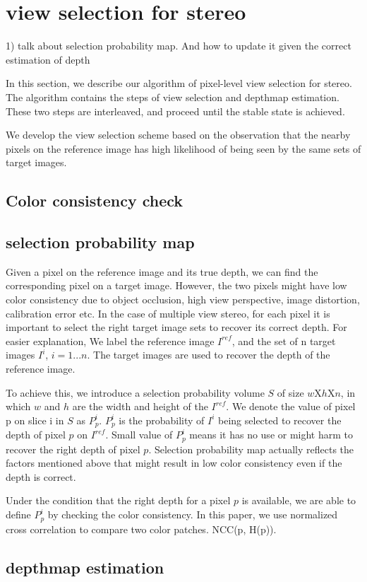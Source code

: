 \section{view selection for stereo}

1) talk about selection probability map. And how to update it given the correct estimation of depth


In this section, we describe our algorithm of pixel-level view selection for stereo.
The algorithm contains the steps of view selection and depthmap estimation.
These two steps are interleaved, and proceed until the stable state is achieved.

We develop the view selection scheme based on the observation that the nearby pixels on the reference image has high likelihood of being seen by the same sets of target images.

\subsection{Color consistency check}







\subsection{selection probability map}

Given a pixel on the reference image and its true depth, we can find the corresponding pixel on a target image. However, the two pixels might have low color consistency due to object occlusion, high view perspective, image distortion, calibration error etc. In the case of multiple view stereo, for each pixel it is important to select the right target image sets to recover its correct depth. For easier explanation, We label the reference image $I^{ref}$, and the set of n target images $I^i$, $i = 1...n$. The target images are used to recover the depth of the reference image.

To achieve this, we introduce a selection probability volume $S$ of size $w$X$h$X$n$, in which $w$ and $h$ are the width and height of the $I^{ref}$. We denote the value of pixel p on slice i in $S$ as $P^i_p$. $P^i_p$ is the probability of $I^i$ being selected to recover the depth of pixel $p$ on $I^{ref}$. Small value of $P^i_p$ means it has no use or might harm to recover the right depth of pixel $p$. Selection probability map actually reflects the factors mentioned above that might result in low color consistency even if the depth is correct.

Under the condition that the right depth for a pixel $p$ is available, we are able to define $P^i_p$ by checking the color consistency. In this paper, we use normalized cross correlation to compare two color patches. NCC(p, H(p)).



\subsection{depthmap estimation}













